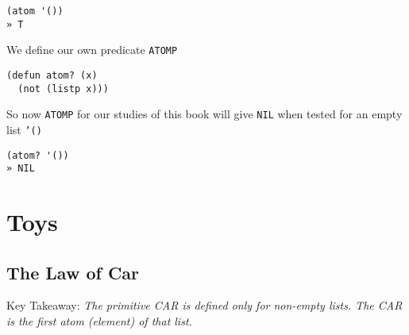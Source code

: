 \documentclass[11pt]{article}
\begin{document}
\begin{itemize}
\begin{verbatim}
(atom '())
» T
\end{verbatim}

We define our own predicate \texttt{ATOMP}

\begin{verbatim}
(defun atom? (x)
  (not (listp x)))
\end{verbatim}

So now \texttt{ATOMP} for our studies of this book will give \texttt{NIL} when tested for an empty list \texttt{'()}

\begin{verbatim}
(atom? '())
» NIL
\end{verbatim}
\end{itemize}



\newpage
\section{Toys}
\label{sec:orgff34c00}

\subsection{The Law of Car}
\label{sec:orgbd5af47}
Key Takeaway:
\emph{The primitive CAR is defined only for non-empty lists. The CAR is the first atom (element) of that list.}

\vspace{1em}
\end{document}
